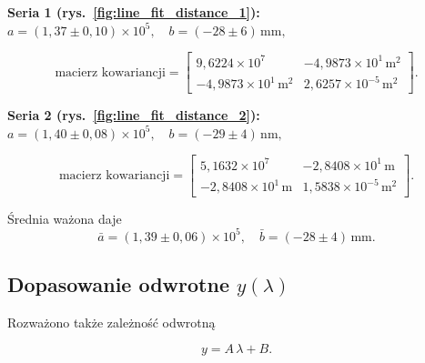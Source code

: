\documentclass[12pt]{article}
\begin{document}
\textbf{Seria 1 (rys.~\ref{fig:line_fit_distance_1}):}  
\(a = (1{,}37 \pm 0{,}10) \times 10^{5}, \quad b = (-28 \pm 6)\,\mathrm{mm},\)

\[
  \text{macierz kowariancji} =
  \begin{bmatrix}
    9{,}6224 \times 10^{7} & -4{,}9873 \times 10^{1}\,\mathrm{m}^2 \\
    -4{,}9873\times 10^{1}\,\mathrm{m}^2 & 2{,}6257 \times 10^{-5}\,\mathrm{m}^2
  \end{bmatrix}.
\]

\textbf{Seria 2 (rys.~\ref{fig:line_fit_distance_2}):}  
\(a = (1{,}40 \pm 0{,}08) \times 10^{5}, \quad b = (-29 \pm 4)\,\mathrm{nm},\)

\[
  \text{macierz kowariancji} =
  \begin{bmatrix}
      5{,}1632 \times 10^{7} & -2{,}8408\times10^{1}\,\mathrm{m} \\
    -2{,}8408\times10^{1}\,\mathrm{m} & 1{,}5838\times10^{-5}\,\mathrm{m}^2
  \end{bmatrix}.
\]

Średnia ważona daje  
\[
  \bar{a} = (1{,}39 \pm 0{,}06) \times 10^{5}, \quad
  \bar{b} = (-28 \pm 4)\,\mathrm{mm}.
\]

\subsection*{Dopasowanie odwrotne \(y(\lambda)\)}

Rozważono także zależność odwrotną  

\[
  y = A\,\lambda + B.
\]
\end{document}
